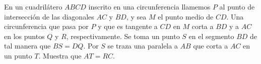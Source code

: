 En un cuadrilátero $ABCD$ inscrito en una circunferencia llamemos $P$ al punto de intersección de las diagonales $AC$ y $BD$, y sea $M$ el punto medio de $CD$. Una circunferencia que pasa por $P$ y que es tangente a $CD$ en $M$ corta a $BD$ y a $AC$ en los puntos $Q$ y $R$, respectivamente. Se toma un punto $S$ en el segmento $BD$ de tal manera que $BS=DQ$. Por $S$ se traza una paralela a $AB$ que corta a $AC$ en un punto $T$. Muestra que $AT=RC$.